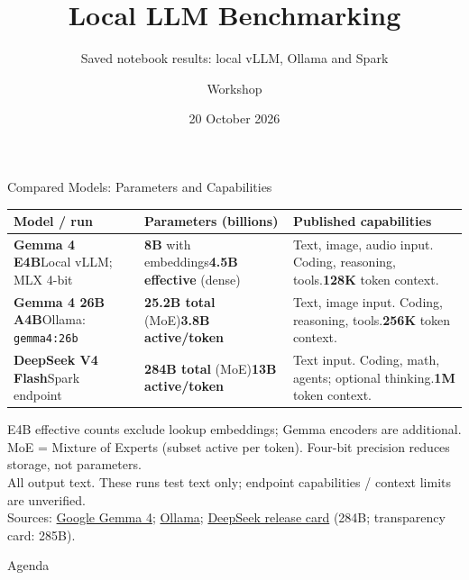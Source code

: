 \documentclass[aspectratio=169,12pt]{beamer}
\title{Local LLM Benchmarking}
\subtitle{Saved notebook results: local vLLM, Ollama and Spark}
\author{Workshop}
\date{20 October 2026}
\begin{document}
\begin{frame}\titlepage{}\end{frame}
\begin{frame}{Compared Models: Parameters and Capabilities}
\footnotesize
\begin{tabular}{@{}>{\raggedright\arraybackslash}p{}>{\raggedright\arraybackslash}p{}>{\raggedright\arraybackslash}p{}@{}}
\toprule
Model / run & Parameters (billions) & Published capabilities \\
\midrule
\textbf{Gemma 4 E4B}\newline Local vLLM; MLX 4-bit & \textbf{8B} with embeddings\newline \textbf{4.5B effective} (dense) & Text, image, audio input. Coding, reasoning, tools.\newline \textbf{128K} token context. \\
\addlinespace
\textbf{Gemma 4 26B A4B}\newline Ollama: \texttt{gemma4:26b} & \textbf{25.2B total} (MoE)\newline \textbf{3.8B active/token} & Text, image input. Coding, reasoning, tools.\newline \textbf{256K} token context. \\
\addlinespace
\textbf{DeepSeek V4 Flash}\newline Spark endpoint & \textbf{284B total} (MoE)\newline \textbf{13B active/token} & Text input. Coding, math, agents; optional thinking.\newline \textbf{1M} token context. \\
\bottomrule
\end{tabular}
\vfill
\footnotesize
E4B effective counts exclude lookup embeddings; Gemma encoders are additional. MoE = Mixture of Experts (subset active per token). Four-bit precision reduces storage, not parameters.\\[0.3em]
All output text. These runs test text only; endpoint capabilities / context limits are unverified.\\[0.3em]
Sources: \href{https://ai.google.dev/gemma/docs/core/model_card_4}{Google Gemma 4}; \href{https://ollama.com/library/gemma4:26b}{Ollama}; \href{https://huggingface.co/deepseek-ai/DeepSeek-V4-Flash}{DeepSeek release card} (284B; transparency card: 285B).
\end{frame}
\begin{frame}{Agenda}\small\tableofcontents[hideallsubsections]\end{frame}
\end{document}

